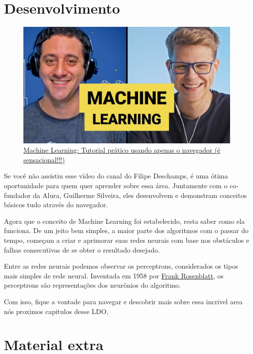 \documentclass{article}
\begin{document}
    \newpage
    \section{Desenvolvimento} \label{sec:desenvolvimento}

    \begin{figure}[htp]
        \centering
        \includegraphics[scale=0.3]{maxresdefault.jpg}
        \caption{\href{https://youtu.be/JyGGMyR3x5I}{Machine Learning: Tutorial prático usando apenas o navegador (é sensacional!!!)}}
    \end{figure}

    Se você não assistiu esse vídeo do canal do Filipe Deschamps, é uma ótima oportunidade para 
    quem quer aprender sobre essa área. Juntamente com o co-fundador da Alura, Guilherme Silveira, 
    eles desenvolvem e demonstram conceitos básicos tudo através do navegador.

    Agora que o conceito de Machine Learning foi estabelecido, resta saber como ela funciona. De 
    um jeito bem simples, a maior parte dos algoritmos com o passar do tempo, começam a criar e 
    aprimorar suas redes neurais com base nos obstáculos e falhas consecutivas de se obter o 
    resultado desejado. 
    
    Entre as redes neurais podemos observar os perceptrons, considerados os tipos mais simples de 
    rede neural. Inventada em 1958 por \href{https://en.wikipedia.org/wiki/Arthur_Samuel}{Frank Rosenblatt}, 
    os perceptrons são representações dos neurônios do algoritmo.  

    Com isso, fique a vontade para navegar e descobrir mais sobre essa incrivel area nós proximos capitulos desse
    LDO.

    \newpage
    \section*{\centering Material extra}\label{sec:extra} %
\end{document}
